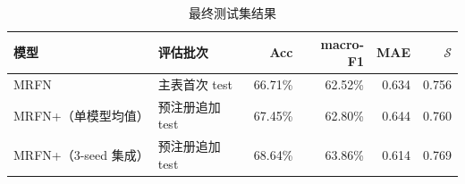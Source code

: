 \begin{table}[htbp]
  \centering
\caption{最终测试集结果}
  \label{tab:p2-final}
  \begin{tabularx}{\textwidth}{@{}XXrrrr@{}}
    \toprule
    模型 & 评估批次 & Acc & macro-F1 & MAE & $\mathcal{S}$ \\
    \midrule
    MRFN & 主表首次 test & 66.71\% & 62.52\% & 0.634 & 0.756 \\
    MRFN+（单模型均值） & 预注册追加 test & 67.45\% & 62.80\% & 0.644 & 0.760 \\
    MRFN+（3-seed 集成） & 预注册追加 test & 68.64\% & 63.86\% & 0.614 & 0.769 \\
    \bottomrule
  \end{tabularx}
  \par \smallskip
  \end{table}